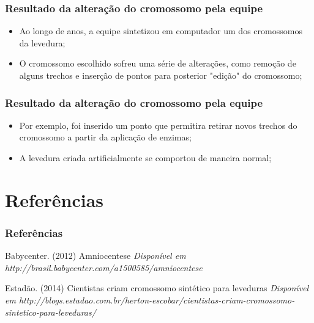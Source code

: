 \documentclass{beamer}
\begin{document}
\begin{frame}
\frametitle{Resultado da alteração do cromossomo pela equipe}
\begin{itemize}
\item Ao longo de anos, a equipe sintetizou em computador um dos cromossomos da levedura;
\item O cromossomo escolhido sofreu uma série de alterações, como remoção de alguns trechos e inserção de pontos para posterior "edição" do cromossomo;
\end{itemize}
\end{frame}

\begin{frame}
\frametitle{Resultado da alteração do cromossomo pela equipe}
\begin{itemize}
\item Por exemplo, foi inserido um ponto que permitira retirar novos trechos do cromossomo a partir da aplicação de enzimas;
\item A levedura criada artificialmente se comportou de maneira normal;
\end{itemize}
\end{frame}




\section{Referências}


\begin{frame}
\frametitle{Referências}
\footnotesize{
\begin{thebibliography}{9} 

 Babycenter. (2012)
\newblock Amniocentese
\newblock \emph{Disponível em http://brasil.babycenter.com/a1500585/amniocentese}

 Estadão. (2014)
\newblock Cientistas criam cromossomo sintético para leveduras
\newblock \emph{Disponível em http://blogs.estadao.com.br/herton-escobar/cientistas-criam-cromossomo-sintetico-para-leveduras/}

\end{thebibliography}
}
\end{frame}
\end{document}
